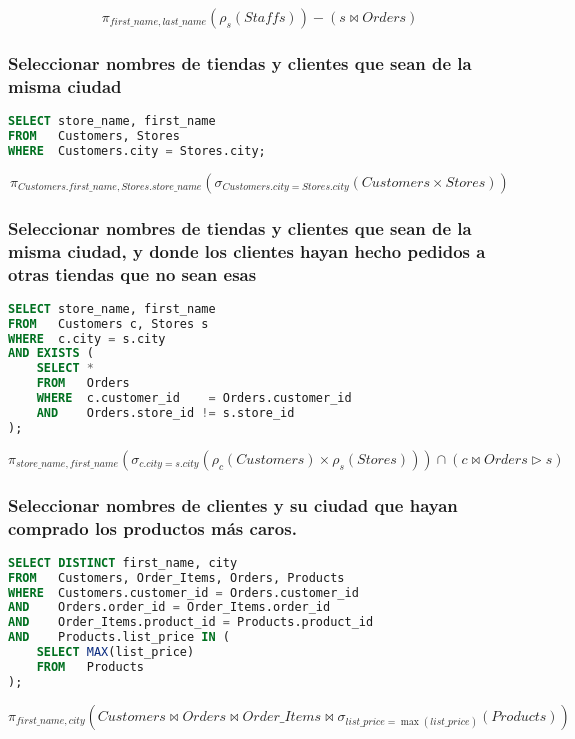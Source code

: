 \[\pi_{first\_name,last\_name}(\rho_s(Staffs))-(s\bowtie Orders)\]

\subsubsection{Seleccionar nombres de tiendas y clientes que sean de la misma ciudad}

\begin{lstlisting}[language=SQL]
SELECT store_name, first_name
FROM   Customers, Stores
WHERE  Customers.city = Stores.city;
\end{lstlisting}

\[\pi_{Customers.first\_name,Stores.store\_name}(\sigma_{Customers.city=Stores.city}(Customers\times Stores))\]

\subsubsection{Seleccionar nombres de tiendas y clientes que sean de la misma ciudad, y donde los clientes hayan hecho pedidos a otras tiendas que no sean esas}

\begin{lstlisting}[language=SQL]
SELECT store_name, first_name
FROM   Customers c, Stores s
WHERE  c.city = s.city
AND EXISTS (
	SELECT *
	FROM   Orders
	WHERE  c.customer_id    = Orders.customer_id
	AND    Orders.store_id != s.store_id
);
\end{lstlisting}

\[\pi_{store\_name,first\_name}(\sigma_{c.city=s.city}(\rho_c(Customers)\times\rho_s(Stores)))\cap(c\bowtie Orders\triangleright s)\]

\subsubsection{Seleccionar nombres de clientes y su ciudad que hayan comprado los productos más caros.}

\begin{lstlisting}[language=SQL]
SELECT DISTINCT first_name, city
FROM   Customers, Order_Items, Orders, Products
WHERE  Customers.customer_id = Orders.customer_id
AND    Orders.order_id = Order_Items.order_id
AND    Order_Items.product_id = Products.product_id
AND    Products.list_price IN (
	SELECT MAX(list_price)
	FROM   Products
);
\end{lstlisting}

\[\pi_{first\_name,city}(Customers\bowtie Orders\bowtie Order\_Items\bowtie \sigma_{list\_price=\max(list\_price)}(Products))\]

